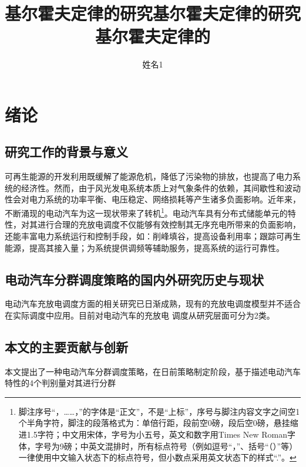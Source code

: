\documentclass[bachelor]{NCEPU-thesis}
\title{基尔霍夫定律的研究基尔霍夫定律的研究基尔霍夫定律的}{English Title and English Title and English Title}
\author{姓名1}{Test1}
\begin{document}
\makecoverbd





\thesistableofcontents

\chapter{绪论}
\section{研究工作的背景与意义}


可再生能源的开发利用既缓解了能源危机，降低了污染物的排放，也提高了电力系统的经济性。然而，由于风光发电系统本质上对气象条件的依赖，其间歇性和波动性会对电力系统的功率平衡、电压稳定、网络损耗等产生诸多负面影响。近年来，不断涌现的电动汽车为这一现状带来了转机\footnote{脚注序号“，……，”的字体是“正文”，不是“上标”，序号与脚注内容文字之间空1个半角字符，脚注的段落格式为：单倍行距，段前空0磅，段后空0磅，悬挂缩进1.5字符；中文用宋体，字号为小五号，英文和数字用Times New Roman字体，字号为9磅；中英文混排时，所有标点符号（例如逗号“，”、括号“（）”等）一律使用中文输入状态下的标点符号，但小数点采用英文状态下的样式“.”。}。电动汽车具有分布式储能单元的特性，对其进行合理的充放电调度不仅能够有效控制其无序充电所带来的负面影响，还能丰富电力系统运行和控制手段，如：削峰填谷，提高设备利用率；跟踪可再生能源，提高其接入量；为系统提供调频等辅助服务，提高系统的运行可靠性。

\section{电动汽车分群调度策略的国内外研究历史与现状}
电动汽车充放电调度方面的相关研究已日渐成熟，现有的充放电调度模型并不适合在实际调度中应用。目前对电动汽车的充放电
调度从研究层面可分为2类。

\section{本文的主要贡献与创新}
本文提出了一种电动汽车分群调度策略，在日前策略制定阶段，基于描述电动汽车特性的4个判别量对其进行分群
\end{document}
